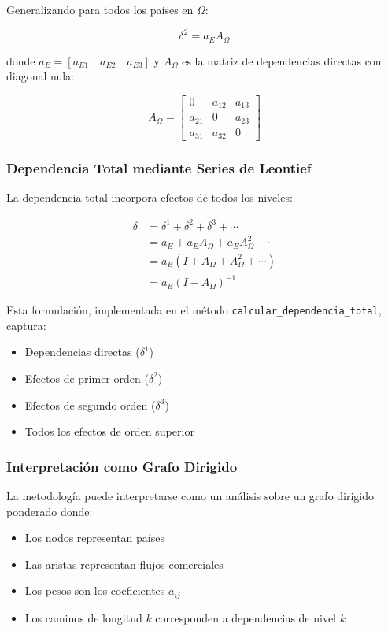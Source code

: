 \documentclass[5p,authoryear]{elsarticle}
\begin{document}
Generalizando para todos los países en $\Omega$:

\begin{equation}
    \delta^2 = a_E A_\Omega
\end{equation}

donde $a_E = [a_{E1} \quad a_{E2} \quad a_{E3}]$ y $A_\Omega$ es la matriz de dependencias directas con diagonal nula:

\begin{equation}
    A_\Omega =
    \begin{bmatrix}
    0 & a_{12} & a_{13} \\
    a_{21} & 0 & a_{23} \\
    a_{31} & a_{32} & 0
    \end{bmatrix}
\end{equation}

\subsubsection{Dependencia Total mediante Series de Leontief}

La dependencia total incorpora efectos de todos los niveles:

\begin{align}
    \delta &= \delta^1 + \delta^2 + \delta^3 + \cdots \\
    &= a_E + a_E A_\Omega + a_E A_\Omega^2 + \cdots \\
    &= a_E(I + A_\Omega + A_\Omega^2 + \cdots) \\
    &= a_E(I - A_\Omega)^{-1}
\end{align}

Esta formulación, implementada en el método \texttt{calcular\_dependencia\_total}, captura:
\begin{itemize}
    \item Dependencias directas ($\delta^1$)
    \item Efectos de primer orden ($\delta^2$)
    \item Efectos de segundo orden ($\delta^3$)
    \item Todos los efectos de orden superior
\end{itemize}

\subsubsection{Interpretación como Grafo Dirigido}
La metodología puede interpretarse como un análisis sobre un grafo dirigido ponderado donde:
\begin{itemize}
    \item Los nodos representan países
    \item Las aristas representan flujos comerciales
    \item Los pesos son los coeficientes $a_{ij}$
    \item Los caminos de longitud $k$ corresponden a dependencias de nivel $k$
\end{itemize}
\end{document}
